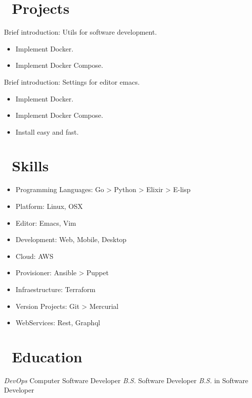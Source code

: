 \documentclass{resume}
\begin{document}
\section{\faUsers\ Projects}
Brief introduction: Utils for software development.
\begin{itemize}
  \item Implement Docker.
  \item Implement Docker Compose.
\end{itemize}

Brief introduction: Settings for editor emacs.
\begin{itemize}
  \item Implement Docker.
  \item Implement Docker Compose.
  \item Install easy and fast.
\end{itemize}

\section{\faCogs\ Skills}
\begin{itemize}[parsep=0.5ex]
  \item Programming Languages: Go > Python > Elixir > E-lisp
  \item Platform: Linux, OSX
  \item Editor: Emacs, Vim
  \item Development: Web, Mobile, Desktop
  \item Cloud: AWS
  \item Provisioner: Ansible > Puppet
  \item Infraestructure: Terraform
  \item Version Projects: Git > Mercurial
  \item WebServices: Rest, Graphql
\end{itemize}

\section{\faGraduationCap\ Education}

\textit{DevOps} Computer Software Developer
\textit{B.S.} Software Developer
\textit{B.S.} in Software Developer
\end{document}
